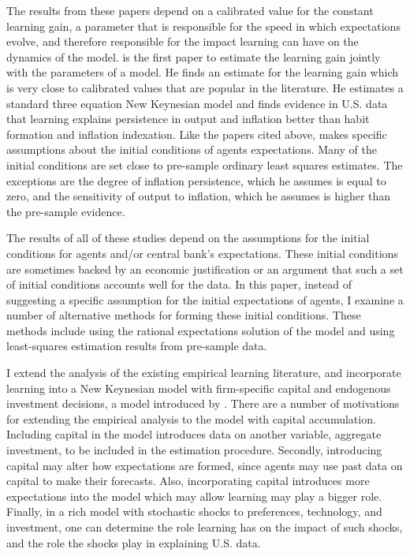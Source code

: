 The results from these papers depend on a calibrated value for the constant learning gain, a parameter that is responsible for the speed in which expectations evolve, and therefore responsible for the impact learning can have on the dynamics of the model.   is the first paper to estimate the learning gain jointly with the parameters of a model.  He finds an estimate for the learning gain which is very close to calibrated values that are popular in the literature.  He estimates a standard three equation New Keynesian model and finds evidence in U.S. data that learning explains persistence in output and inflation better than habit formation and inflation indexation.  Like the papers cited above,  makes specific assumptions about the initial conditions of agents expectations.  Many of the initial conditions are set close to pre-sample ordinary least squares estimates.  The exceptions are the degree of inflation persistence, which he assumes is equal to zero, and the sensitivity of output to inflation, which he assumes is higher than the pre-sample evidence.  

The results of all of these studies depend on the assumptions for the initial conditions for agents and/or central bank's expectations.  These initial conditions are sometimes backed by an economic justification or an argument that such a set of initial conditions accounts well for the data.  In this paper, instead of suggesting a specific assumption for the initial expectations of agents, I examine a number of alternative methods for forming these initial conditions.  These methods include using the rational expectations solution of the model and using least-squares estimation results from pre-sample data.

I extend the analysis of the existing empirical learning literature, and incorporate learning into a New Keynesian model with firm-specific capital and endogenous investment decisions, a model introduced by .  There are a number of motivations for extending the empirical analysis to the model with capital accumulation.  Including capital in the model introduces data on another variable, aggregate investment, to be included in the estimation procedure.  Secondly, introducing capital may alter how expectations are formed, since agents may use past data on capital to make their forecasts.  Also, incorporating capital introduces more expectations into the model which may allow learning may play a bigger role.  Finally, in a rich model with stochastic shocks to preferences, technology, and investment, one can determine the role learning has on the impact of such shocks, and the role the shocks play in explaining U.S. data.

